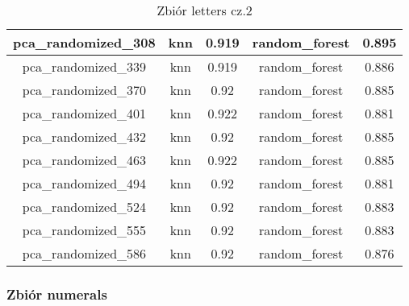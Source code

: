 \documentclass{classrep}
\begin{document}
{{{\begin{table}[!htbp]
\begin{tabular}{|c|c|c|c|c|}
                        pca\_randomized\_308 & knn & 0.919 & random\_forest & 0.895 \\ \hline
                        pca\_randomized\_339 & knn & 0.919 & random\_forest & 0.886 \\ \hline
                        pca\_randomized\_370 & knn & 0.92 & random\_forest & 0.885 \\ \hline
                        pca\_randomized\_401 & knn & 0.922 & random\_forest & 0.881 \\ \hline
                        pca\_randomized\_432 & knn & 0.92 & random\_forest & 0.885 \\ \hline
                        pca\_randomized\_463 & knn & 0.922 & random\_forest & 0.885 \\ \hline
                        pca\_randomized\_494 & knn & 0.92 & random\_forest & 0.881 \\ \hline
                        pca\_randomized\_524 & knn & 0.92 & random\_forest & 0.883 \\ \hline
                        pca\_randomized\_555 & knn & 0.92 & random\_forest & 0.883 \\ \hline
                        pca\_randomized\_586 & knn & 0.92 & random\_forest & 0.876 \\ \hline
                    \end{tabular}
                    \caption
                    {Zbiór letters cz.2}
                    \label{table_principal_component_analysis_letters_2}
                \end{table}
                \FloatBarrier

            }

            \subsubsection{Zbiór numerals} {

}}}
\end{document}
